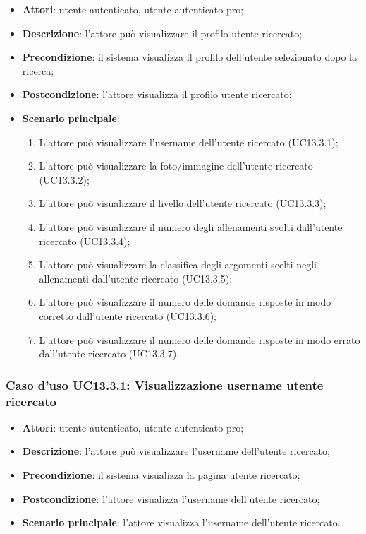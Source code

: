 \begin{itemize}
	\item \textbf{Attori}: utente autenticato, utente autenticato pro;
	\item \textbf{Descrizione}: l'attore può visualizzare il profilo utente ricercato;
	\item \textbf{Precondizione}: il sistema visualizza il profilo dell'utente selezionato dopo la ricerca;
	\item \textbf{Postcondizione}: l'attore visualizza il profilo utente ricercato;
	\item \textbf{Scenario principale}:
	\begin{enumerate}
		\item L'attore può visualizzare l'username dell'utente ricercato (UC13.3.1);
		\item L'attore può visualizzare la foto/immagine dell'utente ricercato (UC13.3.2);
		\item L'attore può visualizzare il livello dell'utente ricercato (UC13.3.3);
		\item L'attore può visualizzare il numero degli allenamenti svolti dall'utente ricercato (UC13.3.4);
		\item L'attore può visualizzare la classifica degli argomenti scelti negli allenamenti dall'utente ricercato (UC13.3.5);
		\item L'attore può visualizzare il numero delle domande risposte in modo corretto dall'utente ricercato (UC13.3.6);
		\item L'attore può visualizzare il numero delle domande risposte in modo errato dall'utente ricercato (UC13.3.7).
	\end{enumerate}
\end{itemize}

\subsubsection{Caso d'uso UC13.3.1: Visualizzazione username utente ricercato}
\begin{itemize}
	\item\textbf{Attori}: utente autenticato, utente autenticato pro;
	\item\textbf{Descrizione}: l'attore può visualizzare l'username dell'utente ricercato;
	\item\textbf{Precondizione}: il sistema visualizza la pagina utente ricercato;
	\item\textbf{Postcondizione}: l'attore visualizza l'username dell'utente ricercato;
	\item\textbf{Scenario principale}: l'attore visualizza l'username dell'utente ricercato.
\end{itemize}

